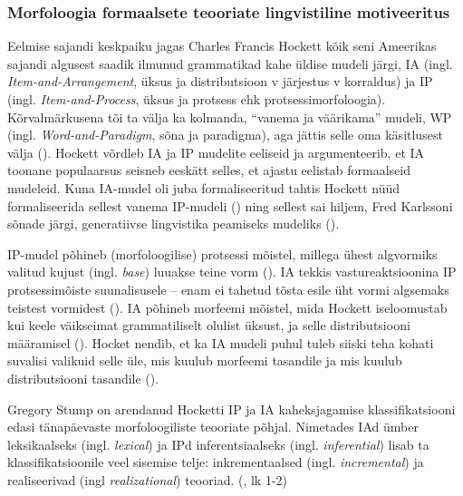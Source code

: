 \documentclass[12pt,a4paper]{article}
\begin{document}
\subsubsection{Morfoloogia formaalsete teooriate lingvistiline motiveeritus}
Eelmise sajandi keskpaiku jagas Charles Francis Hockett kõik seni Ameerikas sajandi algusest saadik ilmunud grammatikad kahe üldise mudeli järgi, IA (ingl. \textit{Item-and-Arrangement}, üksus ja distributsioon v järjestus v korraldus) ja IP (ingl. \textit{Item-and-Process}, üksus ja protsess ehk protsessi\-morfoloogia). Kõrvalmärkusena tõi ta välja ka kolmanda, ``vanema ja väärikama'' mudeli, WP (ingl. \textit{Word-and-Paradigm}, sõna ja paradigma), aga jättis selle oma käsitlusest välja (\cite[210]{hockett_two_1954}). Hockett võrdleb IA ja IP mudelite eeliseid ja argumenteerib, et IA toonane populaarsus seisneb eeskätt selles, et ajastu eelistab formaalseid mudeleid. Kuna IA-mudel oli juba formaliseeritud tahtis Hockett nüüd formaliseerida sellest vanema IP-mudeli (\cite[214]{hockett_two_1954}) ning sellest sai hiljem, Fred Karlssoni sõnade järgi, generatiivse lingvistika peamiseks mudeliks (\cite[126]{karlsson_uldkeeleteadus_2002}).

IP-mudel põhineb (morfoloogilise) protsessi mõistel, millega ühest algvormiks valitud kujust (ingl. \textit{base}) luuakse teine vorm (\cite[210]{hockett_two_1954}). IA tekkis vastureaktsioonina IP protsessi\-mõiste suunalisusele -- enam ei tahetud tõsta esile üht vormi algsemaks teistest vormidest (\cite[211]{hockett_two_1954}). IA põhineb morfeemi mõistel, mida Hockett iseloomustab kui keele väikseimat grammatiliselt olulist üksust, ja selle distributsiooni määramisel (\cite[212]{hockett_two_1954}). Hocket nendib, et ka IA mudeli puhul tuleb siiski teha kohati suvalisi valikuid selle üle, mis kuulub morfeemi tasandile ja mis kuulub distributsiooni tasandile (\cite[212]{hockett_two_1954}).

Gregory Stump on arendanud Hocketti IP ja IA kaheks\-jagamise klassifikatsiooni edasi tänapäevaste morfoloogiliste teooriate põhjal. Nimetades IAd ümber leksikaalseks (ingl. \textit{lexical}) ja IPd inferentsiaalseks (ingl. \textit{inferential}) lisab ta klassifikatsioonile veel sisemise telje: inkrementaalsed (ingl. \textit{incremental}) ja realiseerivad (ingl \textit{realizational}) teooriad. (\cite{stump_inflectional_2001}, lk 1-2)
\end{document}
